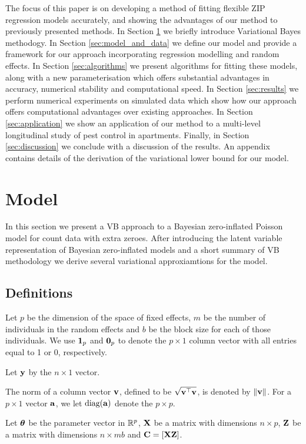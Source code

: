 \documentclass{amsart}[12pt]
\begin{document}
The focus of this paper is on developing a method of fitting flexible ZIP regression models accurately, and
showing the advantages of our method to previously presented methods. In Section \ref{sec:methodology} we
briefly introduce Variational Bayes methodogy. In Section \ref{sec:model_and_data} we define our model and
provide a framework for our approach incorporating regression modelling and random effects. In Section
\ref{sec:algorithms} we present algorithms for fitting these models, along with a new parameterisation which
offers substantial advantages in accuracy, numerical stability and computational speed. In Section
\ref{sec:results} we perform numerical experiments on simulated data which show how our approach offers
computational advantages over existing approaches. In Section \ref{sec:application} we show an application of
our method to a multi-level longitudinal study of pest control in apartments. Finally, in Section
\ref{sec:discussion} we conclude with a discussion of the results. An appendix contains details of the
derivation of the variational lower bound for our model.

\section{Model}
\label{sec:methodology}

In this section we present a VB approach to a Bayesian zero-inflated Poisson model for count data with extra
zeroes. After introducing the latent variable representation of Bayesian zero-inflated models and a short summary 
of VB methodology we derive several variational approxiamtions for the model.

\subsection{Definitions}

Let $p$ be the dimension of the space of fixed effects, $m$ be the number of individuals in the random effects
and $b$ be the block size for each of those individuals.
We use ${\bf 1}_p$ and ${\bf 0}_p$ to denote the $p \times 1$ column vector with all entries equal to 1 or 0,
respectively.

Let ${\bf y}$ by the $n \times 1$ vector.

The norm of a column vector ${\bf v}$, defined to be $\sqrt{{\bf v}^\top {\bf v}}$, is denoted by $\|{\bf v}\|$.
For a $p \times 1$ vector ${\bf a}$, we let $\text{diag}{({\bf a})}$ denote the $p \times p$.

Let ${\boldsymbol \theta}$ be the parameter vector in ${\mathbb{R}}^p$,
${\bf X}$ be a matrix with dimensions $n \times p$,
${\bf Z}$ be a matrix with dimensions $n \times m b$
and ${\bf C} = [ {\bf X} {\bf Z} ]$.
\end{document}
